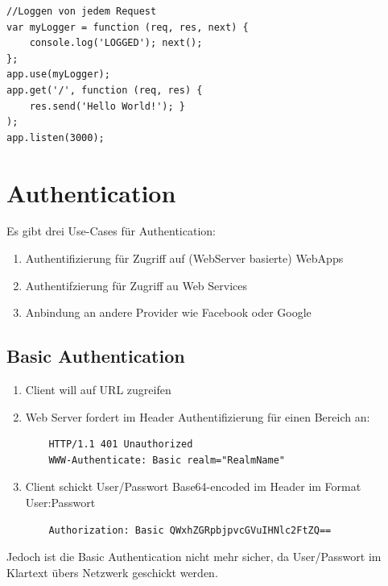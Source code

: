 \documentclass[a4paper, 11pt]{article}
\begin{document}
\begin{lstlisting}
//Loggen von jedem Request
var myLogger = function (req, res, next) { 
	console.log('LOGGED'); next(); 
};
app.use(myLogger); 
app.get('/', function (req, res) { 
	res.send('Hello World!'); }
);
app.listen(3000);
\end{lstlisting}

\section{Authentication}
Es gibt drei Use-Cases für Authentication:

\begin{enumerate}
	\item Authentifizierung für Zugriff auf (WebServer basierte) WebApps
	\item Authentifzierung für Zugriff au Web Services
	\item Anbindung an andere Provider wie Facebook oder Google
\end{enumerate}

\subsection{Basic Authentication}
\begin{enumerate}
	\item Client will auf URL zugreifen
	\item Web Server fordert im Header Authentifizierung für einen Bereich an: \\
	\begin{lstlisting}
	HTTP/1.1 401 Unauthorized 
	WWW-Authenticate: Basic realm="RealmName"
	\end{lstlisting}
	\item Client schickt User/Passwort Base64-encoded im Header im Format User:Passwort \\
	\begin{lstlisting}
	Authorization: Basic QWxhZGRpbjpvcGVuIHNlc2FtZQ==
	\end{lstlisting}
\end{enumerate}

Jedoch ist die Basic Authentication nicht mehr sicher, da User/Passwort im Klartext übers Netzwerk geschickt werden.
\end{document}
